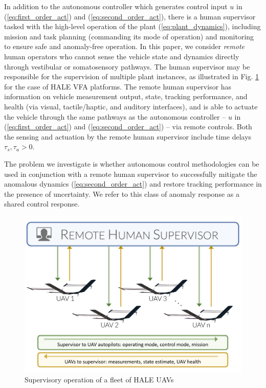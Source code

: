 \documentclass[english]{ifacconf}
\begin{document}
In addition to the autonomous controller which generates control input $u$ in (\ref{eq:first_order_act}) and (\ref{eq:second_order_act}), there is a human supervisor tasked with the high-level operation of the plant (\ref{eq:plant_dynamics}), including mission and task planning (commanding its mode of operation) and monitoring to ensure safe and anomaly-free operation. In this paper, we consider \textit{remote} human operators who cannot sense the vehicle state and dynamics directly through vestibular or somatosensory pathways. The human supervisor may be responsible for the supervision of multiple plant instances, as illustrated in Fig. \ref{fig:uav_supervisor} for the case of HALE VFA platforms. The remote human supervisor has information on vehicle measurement output, state, tracking performance, and health (via visual, tactile/haptic, and auditory interfaces), and is able to actuate the vehicle through the same pathways as the autonomous controller -- $u$ in (\ref{eq:first_order_act}) and (\ref{eq:second_order_act}) -- via remote controls. Both the sensing and actuation by the remote human supervisor include time delays $\tau_s, \tau_a > 0$.

The problem we investigate is whether autonomous control methodologies can be used in conjunction with a remote human supervisor to successfully mitigate the anomalous dynamics (\ref{eq:second_order_act}) and restore tracking performance in the presence of uncertainty. We refer to this class of anomaly response as a shared control response.

\begin{figure}[htbp]
	\centering
	\includegraphics[width=0.95\columnwidth]{../fig/uav_supervisor.pdf}
	\caption{Supervisory operation of a fleet of HALE UAVs}
	\label{fig:uav_supervisor}
\end{figure}
\end{document}
